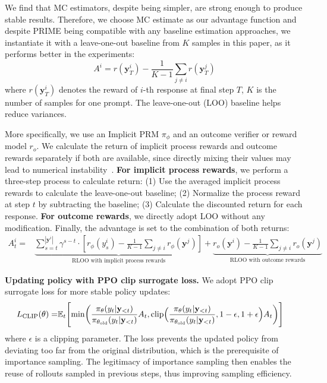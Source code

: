 We find that MC estimators, despite being simpler, are strong enough to produce stable results. Therefore, we choose MC estimate as our advantage function and despite PRIME being compatible with any baseline estimation approaches, we instantiate it with a leave-one-out baseline from $K$ samples \citep{ahmadian2024back} in this paper, as it performs better in the experiments:
\begin{equation}
    A^i = r(\mathbf{y}^i_T)-\frac{1}{K-1} \sum_{j \neq i}r(\mathbf{y}^j_T)
\end{equation}
where $r(\mathbf{y}^i_T)$ denotes the reward of $i$-th response at final step $T$, $K$ is the number of samples for one prompt. The leave-one-out (LOO) baseline helps reduce variances.


More specifically, we use an Implicit PRM $\pi_\phi$ and an outcome verifier or reward model $r_o$.
We calculate the return of implicit process rewards and outcome rewards separately if both are available, since directly mixing their values may lead to numerical instability~\citep{deepseek-math}.
\textbf{For implicit process rewards}, we perform a three-step process to calculate return:
(1) Use the averaged implicit process rewards to calculate the leave-one-out baseline;
(2) Normalize the process reward at step $t$ by subtracting the baseline;
(3) Calculate the discounted return for each response.
\textbf{For outcome rewards}, we directly adopt LOO without any modification.
Finally, the advantage is set to the combination of both returns:
\begin{equation}
\label{eq:adv}
    \begin{aligned}
        A^i_t = &\underbrace{\sum_{s=t}^{|\mathbf{y}^i|} \gamma^{s-t} \cdot \left[r_\phi(y^i_s)-\frac{1}{K-1} \sum_{j \neq i} r_\phi \left(\mathbf{y}^j\right)\right]}_\text{RLOO with implicit process rewards}+\underbrace{r_o\left(\mathbf{y}^i\right)-\frac{1}{K-1} \sum_{j \neq i} r_o\left(\mathbf{y}^j\right)}_\text{RLOO with outcome rewards}
    \end{aligned}
\end{equation}

\textbf{Updating policy with PPO clip surrogate loss.}
We adopt PPO clip surrogate loss for more stable policy updates: 
\begin{equation}
\begin{aligned}
\label{eq:clip}
    L_{\text{CLIP}}(\theta) = &\mathbb{E}_t\Biggl[\min\biggl(\frac{\pi_\theta(y_t|\mathbf{y}_{<t})}{\pi_{\theta_{\text{old}}}(y_t|\mathbf{y}_{<t})}A_t,\text{clip}\Bigl(\frac{\pi_\theta(y_t|\mathbf{y}_{<t})}{\pi_{\theta_{\text{old}}}(y_t|\mathbf{y}_{<t})}, 1-\epsilon, 1+\epsilon\Bigr)A_t\biggr)\Biggr]
\end{aligned}
\end{equation}
where $\epsilon$ is a clipping parameter. The loss prevents the updated policy from deviating too far from the original distribution, which is the prerequisite of importance sampling. 
The legitimacy of importance sampling then enables the reuse of rollouts sampled in previous steps, thus improving sampling efficiency. 








